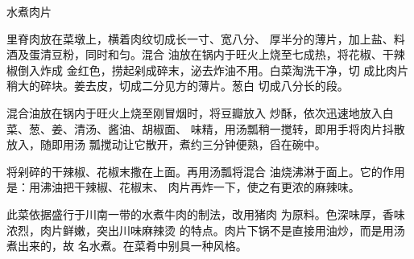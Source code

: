 \begin{recipe}{水煮肉片}

\ingredients


\cooking

\step 里脊肉放在菜墩上，横着肉纹切成长一寸、宽八分、 厚半分的薄片，加上盐、料酒及蛋清豆粉，同时和匀。混合 油放在锅内于旺火上烧至七成热，将花椒、干辣椒倒入炸成 金红色，捞起剁成碎末，泌去炸油不用。白菜淘洗干净，切 成比肉片稍大的碎块。姜去皮，切成二分见方的薄片。葱白 切成八分长的段。

\step 混合油放在锅内于旺火上烧至刚冒烟时，将豆瓣放入 炒酥，依次迅速地放入白菜、葱、姜、清汤、酱油、胡椒面、 味精，用汤瓢稍一搅转，即用手将肉片抖散放入，随即用汤 瓢搅动让它散开，煮约三分钟便熟，舀在碗中。

\step 将剁碎的干辣椒、花椒末撒在上面。再用汤瓢将混合 油烧沸淋于面上。它的作用是：用沸油把干辣椒、花椒末、 肉片再炸一下，使之有更浓的麻辣味。

\notes

此菜依据盛行于川南一带的水煮牛肉的制法，改用猪肉 为原料。色深味厚，香味浓烈，肉片鲜嫩，突出川味麻辣烫 的特点。肉片下锅不是直接用油炒，而是用汤煮出来的，故 名水煮。在菜肴中别具一种风格。

\end{recipe}

